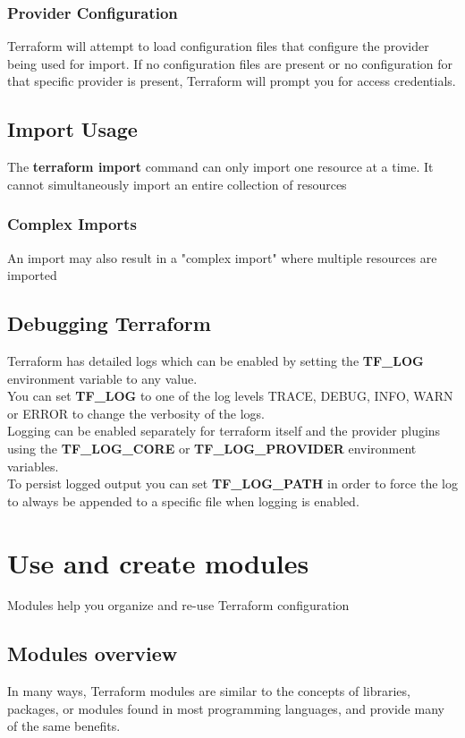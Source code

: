 \documentclass[12pt, letterpaper, twoside]{article}
\begin{document}
\subsubsection{Provider Configuration}
Terraform will attempt to load configuration files that configure the provider being 
used for import. If no configuration files are present or no configuration for that 
specific provider is present, Terraform will prompt you for access credentials.

\subsection{Import Usage}
The \textbf{terraform import} command can only import one resource at a time. 
It cannot simultaneously import an entire collection of resources

\subsubsection{Complex Imports}
An import may also result in a "complex import" where multiple resources are imported

\subsection{Debugging Terraform}
Terraform has detailed logs which can be enabled by setting the \textbf{TF\_LOG} 
environment variable to any value.\\
You can set \textbf{TF\_LOG} to one of the log levels TRACE, DEBUG, INFO, WARN 
or ERROR to change the verbosity of the logs.\\

Logging can be enabled separately for terraform itself and the provider 
plugins using the \textbf{TF\_LOG\_CORE} or \textbf{TF\_LOG\_PROVIDER} 
environment variables.\\

To persist logged output you can set \textbf{TF\_LOG\_PATH} in order to force 
the log to always be appended to a specific file when logging is enabled.

\section{Use and create modules}
Modules help you organize and re-use Terraform configuration

\subsection{Modules overview}
In many ways, Terraform modules are similar to the concepts of libraries, 
packages, or modules found in most programming languages, and provide 
many of the same benefits. 
\end{document}
